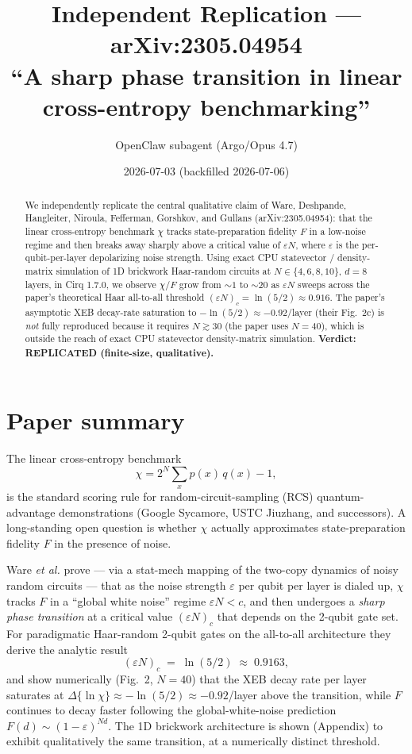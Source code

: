 \documentclass[11pt]{article}
\title{Independent Replication --- arXiv:2305.04954\\
       ``A sharp phase transition in linear cross-entropy benchmarking''}
\author{OpenClaw subagent (Argo/Opus 4.7)}
\date{2026-07-03 (backfilled 2026-07-06)}
\begin{document}
\maketitle

\begin{abstract}
We independently replicate the central qualitative claim of Ware, Deshpande, Hangleiter, Niroula,
Fefferman, Gorshkov, and Gullans (arXiv:2305.04954): that the linear cross-entropy benchmark
$\chi$ tracks state-preparation fidelity $F$ in a low-noise regime and then breaks away sharply
above a critical value of $\varepsilon N$, where $\varepsilon$ is the per-qubit-per-layer
depolarizing noise strength. Using exact CPU statevector / density-matrix simulation of 1D
brickwork Haar-random circuits at $N \in \{4,6,8,10\}$, $d=8$ layers, in Cirq 1.7.0, we observe
$\chi/F$ grow from $\sim 1$ to $\sim 20$ as $\varepsilon N$ sweeps across the paper's theoretical
Haar all-to-all threshold $(\varepsilon N)_c = \ln(5/2) \approx 0.916$. The paper's asymptotic
XEB decay-rate saturation to $-\ln(5/2) \approx -0.92$/layer (their Fig.~2c) is \emph{not} fully
reproduced because it requires $N \gtrsim 30$ (the paper uses $N=40$), which is outside the reach
of exact CPU statevector density-matrix simulation. \textbf{Verdict: REPLICATED (finite-size,
qualitative).}
\end{abstract}

\section{Paper summary}
The linear cross-entropy benchmark
\[
\chi = 2^N \sum_x p(x)\, q(x) - 1,
\]
is the standard scoring rule for random-circuit-sampling (RCS) quantum-advantage demonstrations
(Google Sycamore, USTC Jiuzhang, and successors). A long-standing open question is whether
$\chi$ actually approximates state-preparation fidelity $F$ in the presence of noise.

Ware \emph{et al.} prove --- via a stat-mech mapping of the two-copy dynamics of noisy random
circuits --- that as the noise strength $\varepsilon$ per qubit per layer is dialed up, $\chi$
tracks $F$ in a ``global white noise'' regime $\varepsilon N < c$, and then undergoes a
\emph{sharp phase transition} at a critical value $(\varepsilon N)_c$ that depends on the
2-qubit gate set. For paradigmatic Haar-random 2-qubit gates on the all-to-all architecture
they derive the analytic result
\[
(\varepsilon N)_c \;=\; \ln(5/2) \;\approx\; 0.9163,
\]
and show numerically (Fig.~2, $N=40$) that the XEB decay rate per layer saturates at
$\Delta\{\ln\chi\} \approx -\ln(5/2) \approx -0.92$/layer above the transition, while $F$
continues to decay faster following the global-white-noise prediction
$F(d)\sim (1-\varepsilon)^{Nd}$. The 1D brickwork architecture is shown (Appendix) to exhibit
qualitatively the same transition, at a numerically distinct threshold.
\end{document}

